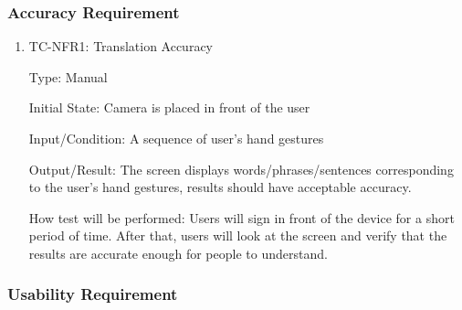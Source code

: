 \documentclass[12pt]{article}
\begin{document}
\subsubsection{Accuracy Requirement}

\begin{enumerate}

\item{TC-NFR1: Translation Accuracy\\}

Type: Manual
					
Initial State: Camera is placed in front of the user
					
Input/Condition: A sequence of user’s hand gestures
					
Output/Result: The screen displays words/phrases/sentences corresponding to the user's hand gestures, results should have acceptable accuracy.
					
How test will be performed: Users will sign in front of the device for a short period of time. After that, users will look at the screen and verify that the results are accurate enough for people to understand.

\end{enumerate}

\subsubsection{Usability Requirement}
\end{document}
